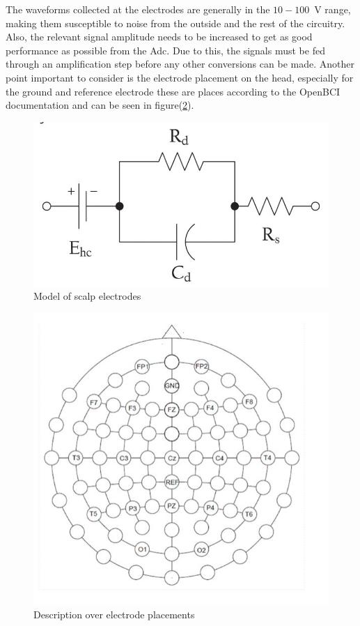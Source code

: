 The waveforms collected at the electrodes are generally in the $10-100$~{\textmu}V range, making them susceptible to noise from the outside and the rest of the circuitry. Also, the relevant signal amplitude needs to be increased to get as good performance as possible from the Adc. Due to this, the signals must be fed through an amplification step before any other conversions can be made. Another point important to consider is the electrode placement on the head, especially for the ground and reference electrode these are places according to the OpenBCI documentation \cite{OpenBCIcap} and can be seen in figure(\ref{fig:Electrodesplace}).
\begin{figure} [H]
\begin{center}
\includegraphics[scale=0.5]{images/electrodemodel.jpg}
   \caption{Model of scalp electrodes}
    \label{fig:Electrodes}
\end{center}
\end{figure}
\begin{figure} [H]
\begin{center}
\includegraphics[scale=0.6]{images/Electrodeplacements.jpg}
   \caption{Description over electrode placements}
    \label{fig:Electrodesplace}
\end{center}
\end{figure}
